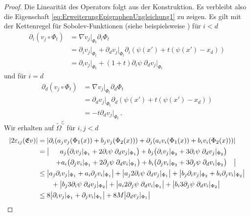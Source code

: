 \documentclass{scrartcl}
\def\e{\varepsilon}
\newcommand{\tiOmega}{\tilde{\Omega}}
\newcommand{\erw}{\mathfrak{E}}			%
\DeclarePairedDelimiter{\abs}{\lvert}{\rvert}
\begin{document}
\begin{proof}
	Die Linearität des Operators folgt aus der Konstruktion. Es verbleibt also die Eigen\-schaft \eqref{eq:ErweiterungEpigraphenUngleichung1} zu zeigen.
	Es gilt mit der Kettenregel für Sobolev-Funktionen (siehe beispielsweise \cite[S.125]{Alt-2016}) für $i<d$
	\begin{align*}
		\partial_i(v_j\circ\Phi_t)
		&= \nabla v_j\big\vert_{\Phi_t} \partial_i\Phi_t \\
		&= \partial_iv_j\big\vert_{\Phi_t}+\partial_dv_j\big\vert_{\Phi_t}\partial_i(\psi(x')+t(\psi(x')-x_d)) \\
		&= \partial_iv_j\big\vert_{\Phi_t}+(1+t)\partial_i\psi\;\partial_dv_j\big\vert_{\Phi_t}
	\end{align*}
	und für $i=d$
	\begin{align*}
		\partial_d(v_j\circ\Phi_t)
		&= \nabla v_j\big\vert_{\Phi_t} \partial_d\Phi_t \\
		&= \partial_dv_j\big\vert_{\Phi_t}\partial_d(\psi(x')+t(\psi(x')-x_d)) \\
		&= -t\partial_dv_j\big\vert_{\Phi_t}\,.
	\end{align*}
	Wir erhalten auf $\tiOmega^\complement$ für $i,j<d$
	\begin{align*}
		\abs*{2\e_{ij}(\erw v)}
		&= \abs*{\partial_i(a_jv_j(\Phi_1(x))+b_jv_j(\Phi_2(x)))+\partial_j(a_iv_i(\Phi_1(x))+b_iv_i(\Phi_2(x)))} \\
		&\begin{aligned}
		&= \big|&a_j\big(\partial_iv_j\vert_{\Phi_1} +2\partial_i\psi\;\partial_dv_j\vert_{\Phi_1}\big)+b_j\big(\partial_iv_j\vert_{\Phi_2} +3\partial_i\psi\;\partial_dv_j\vert_{\Phi_2}\big) \\
		& &+a_i\big(\partial_jv_i\vert_{\Phi_1} +2\partial_j\psi\;\partial_dv_i\vert_{\Phi_1}\big)+b_i\big(\partial_jv_i\vert_{\Phi_2} +3\partial_j\psi\;\partial_dv_i\vert_{\Phi_2}\big) &\quad\big|
		\end{aligned} \\
		&\leq \big|a_j\partial_iv_j\vert_{\Phi_1}+a_i\partial_jv_i\vert_{\Phi_1}\big|
		+\big|a_j2\partial_i\psi\;\partial_dv_j\vert_{\Phi_1}\big|
		+\big|b_j\partial_iv_j\vert_{\Phi_2}+b_i\partial_jv_i\vert_{\Phi_2}\big| \\
		&\qquad+\big|b_j3\partial_i\psi\;\partial_dv_j\vert_{\Phi_2}\big|
		+\big|a_i2\partial_j\psi\;\partial_dv_i\vert_{\Phi_1}\big|
		+\big|b_i3\partial_j\psi\;\partial_dv_i\vert_{\Phi_2}\big| \\
		&\leq 8\big|\partial_iv_j\vert_{\Phi_1}+\partial_jv_i\vert_{\Phi_1}\big|
		+8M\big|\partial_dv_j\vert_{\Phi_1}\big|

\end{align*}
\end{proof}
\end{document}
